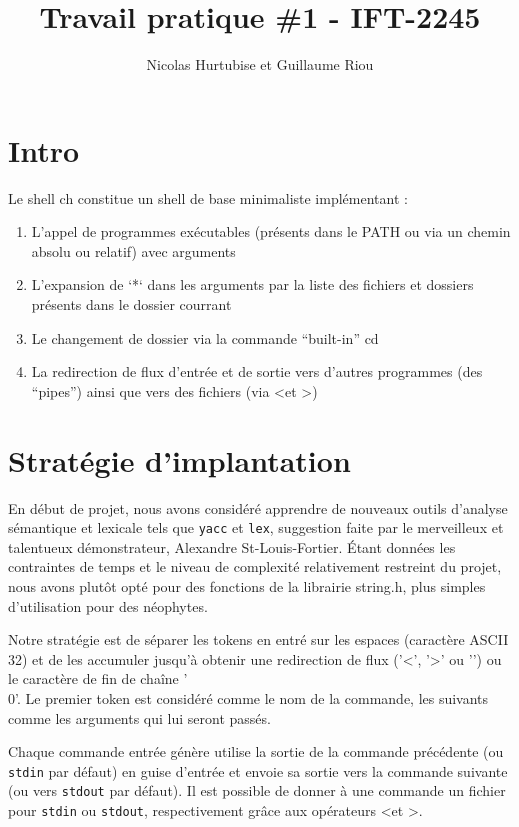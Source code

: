 \documentclass{article}
\title{Travail pratique \#1 - IFT-2245}
\author{Nicolas Hurtubise et Guillaume Riou}
\begin{document}
\maketitle

\newpage

\section{Intro}

Le shell ch constitue un shell de base minimaliste implémentant :

\begin{enumerate}
\item L'appel de programmes exécutables (présents dans le PATH ou via un chemin absolu ou relatif) avec arguments
\item L'expansion de `*` dans les arguments par la liste des fichiers et dossiers présents dans le dossier courrant
\item Le changement de dossier via la commande ``built-in'' cd
\item La redirection de flux d'entrée et de sortie vers d'autres programmes (des ``pipes'') ainsi que vers des fichiers (via \textless et \textgreater)
\end{enumerate}

\section{Stratégie d'implantation}

En début de projet, nous avons considéré apprendre de nouveaux outils d'analyse sémantique et lexicale tels que \texttt{yacc} et \texttt{lex}, suggestion faite par le merveilleux et talentueux démonstrateur, Alexandre St-Louis-Fortier. Étant données les contraintes de temps et le niveau de complexité relativement restreint du projet, nous avons plutôt opté pour des fonctions de la librairie string.h, plus simples d'utilisation pour des néophytes.


Notre stratégie est de séparer les tokens en entré sur les espaces (caractère ASCII 32) et de les accumuler jusqu'à obtenir une redirection de flux ('\textless', '\textgreater' ou '\textbar') ou le caractère de fin de chaîne '\\0'. Le premier token est considéré comme le nom de la commande, les suivants comme les arguments qui lui seront passés.


Chaque commande entrée génère utilise la sortie de la commande précédente (ou \texttt{stdin} par défaut) en guise d'entrée et envoie sa sortie vers la commande suivante (ou vers \texttt{stdout} par défaut). Il est possible de donner à une commande un fichier pour \texttt{stdin} ou \texttt{stdout}, respectivement grâce aux opérateurs \textless et \textgreater.
\end{document}
